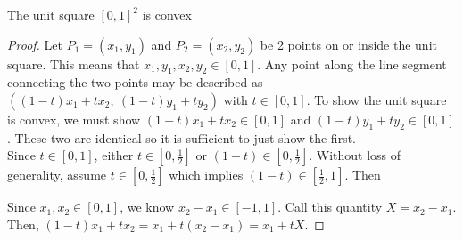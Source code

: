 \begin{example}[A region in $\R^2$]
    The unit square $[0,1]^2$ is convex
    \begin{proof}
        Let $P_1=(x_1,y_1)$ and $P_2=(x_2,y_2)$ be 2 points on or inside the unit square. This means that $x_1,y_1,x_2,y_2\in[0,1]$. Any point along the line segment connecting the two points may be described as \\$((1-t)x_1+tx_2,\ (1-t)y_1+ty_2)$ with $t\in[0,1]$. To show the unit square is convex, we must show $(1-t)x_1+tx_2\in[0,1]$ and $(1-t)y_1+ty_2\in[0,1]$. These two are identical so it is sufficient to just show the first.\\

        Since $t\in[0,1]$, either $t\in[0,\frac{1}{2}]$ or $(1-t)\in[0,\frac{1}{2}]$. Without loss of generality, assume $t\in[0,\frac{1}{2}]$ which implies $(1-t)\in[\frac{1}{2},1]$. Then 
        
        Since $x_1,x_2\in[0,1]$, we know $x_2-x_1\in[-1,1]$. Call this quantity $X=x_2-x_1$. Then, $(1-t)x_1+tx_2 = x_1 + t(x_2-x_1)=x_1+tX$. 
    \end{proof}
\end{example}